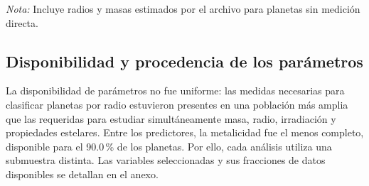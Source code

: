 \begin{table}[htbp]
    \centering
    \caption{Estadística descriptiva de las variables planetarias y estelares principales.}
    \label{tab:D-T3}
    \small
    \par\smallskip
    {\footnotesize\textit{Nota:} Incluye radios y masas estimados por el archivo para planetas sin medición directa.}
\end{table}

\subsection{Disponibilidad y procedencia de los parámetros}
\label{sec:res-catalogo-parametros}

La disponibilidad de parámetros no fue uniforme: las medidas necesarias para clasificar planetas por radio estuvieron presentes en una población más amplia que las requeridas para estudiar simultáneamente masa, radio, irradiación y propiedades estelares. Entre los predictores, la metalicidad fue el menos completo, disponible para el 90.0\,\% de los planetas. Por ello, cada análisis utiliza una submuestra distinta. Las variables seleccionadas y sus fracciones de datos disponibles se detallan en el anexo.

